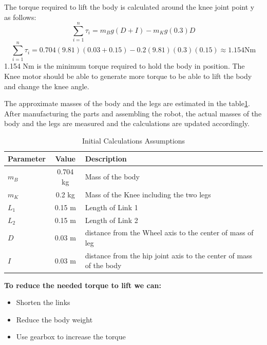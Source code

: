 The torque required to lift the body is calculated around the knee joint point y as follows:
\begin{equation}
	\sum_{i=1}^{n} \tau_{i}=m_{B}g(D+I)-m_{K}g(0.3)D
\end{equation}
\begin{equation}
	\sum_{i=1}^{n} \tau_{i}=0.704(9.81)(0.03+0.15)-0.2(9.81)(0.3)(0.15) \approx 1.154 \mathrm{Nm}
\end{equation}
1.154 $\mathrm{Nm}$ is the minimum torque required to hold the body in position.
The Knee motor should be able to generate more torque to be able to lift the body and change the knee angle.

The approximate masses of the body and the legs are estimated in the table\ref{tab:initialcalculationsassumptions}.
After manufacturing the parts and assembling the robot, the actual masses of the body and the legs are measured and the calculations are updated accordingly.
\begin{table}[h]
	\centering
	\caption{Initial Calculations Assumptions}
	\label{tab:initialcalculationsassumptions}
	\begin{tabular}{lcl}
		\toprule
		Parameter & Value & Description 			  \\
		\midrule
		$m_B$         & 0.704 kg  & Mass of the body  \\
		$m_K$         & 0.2 kg  & Mass of the Knee including the two legs\\
		$L_1$         & 0.15 m   & Length of Link 1  \\
		$L_2$         & 0.15 m   & Length of Link 2   \\
		$D$ 	  	  & 0.03 m   & distance from the Wheel axis to the center of mass of leg \\
		$I$ 	  	  & 0.03 m   & distance from the hip joint axis to the center of mass of the body   \\
		\bottomrule
	\end{tabular}
\end{table}

\begin{notebox}
	\textbf{To reduce the needed torque to lift we can:}
	\begin{itemize}
		\item Shorten the links
		\item Reduce the body weight
		\item Use gearbox to increase the torque
	\end{itemize}
\end{notebox}

